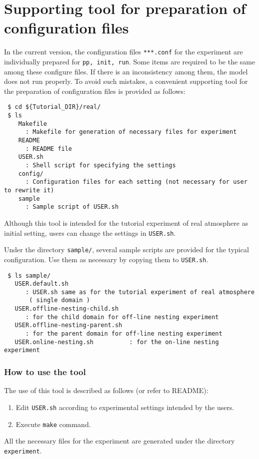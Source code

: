 \section{Supporting tool for preparation of configuration files} \label{sec:basic_makeconf}

In the current version, the configuration files \verb|***.conf| for the experiment are individually prepared for \verb|pp, init, run|. Some items are required to be the same among these configure files. If there is an inconsistency among them, the model does not run properly. To avoid such mistakes, a convenient supporting tool for the preparation of configuration files is provided as follows:
\begin{verbatim}
 $ cd ${Tutorial_DIR}/real/
 $ ls
    Makefile 
      : Makefile for generation of necessary files for experiment
    README
      : README file
    USER.sh
      : Shell script for specifying the settings
    config/  
      : Configuration files for each setting (not necessary for user to rewrite it)
    sample
      : Sample script of USER.sh
\end{verbatim}
Although this tool is intended for the tutorial experiment of real atmosphere as initial setting, users can change the settings in \verb|USER.sh|.

Under the directory \verb|sample/|,   several sample scripts are provided for the typical configuration. Use them as necessary by copying them to \verb|USER.sh|.
\begin{verbatim}
 $ ls sample/
   USER.default.sh                 
      : USER.sh same as for the tutorial experiment of real atmosphere
       ( single domain )
   USER.offline-nesting-child.sh   
      : for the child domain for off-line nesting experiment
   USER.offline-nesting-parent.sh  
      : for the parent domain for off-line nesting experiment
   USER.online-nesting.sh          : for the on-line nesting experiment
\end{verbatim}


\subsubsection{How to use the tool}

The use of this tool is described as follows (or refer to README):
\begin{enumerate}
  \item Edit \verb|USER.sh| according to experimental settings intended by the users.
  \item Execute \verb|make| command.
\end{enumerate}
 All the necessary files for the experiment are generated under the directory \verb|experiment|.

